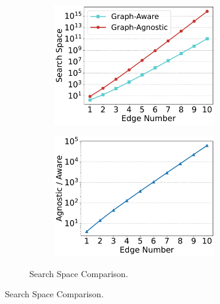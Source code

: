 \begin{figure}[ht]
    \centering
    \begin{subfigure}[b]{\linewidth}
        \centering
        \begin{subfigure}[b]{.45\linewidth}
            \centering
            \includegraphics[width=\linewidth]{./figures/exp/compare_search_space.pdf}
        \end{subfigure}
        \begin{subfigure}[b]{0.45\linewidth}
            \centering
            \includegraphics[width=\linewidth]{./figures/exp/compare_search_space_ratio.pdf}
        \end{subfigure}
        \caption{Search Space Comparison.}
        \label{fig:exp-search-space}

\end{subfigure}
\end{figure}
